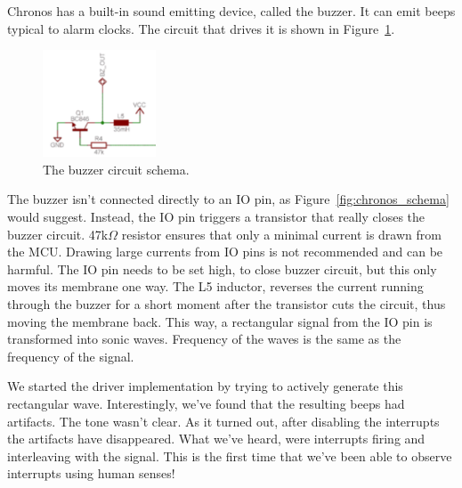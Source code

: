 Chronos has a built-in sound emitting device, called the buzzer. It can emit beeps typical to alarm clocks. The circuit that drives it is shown in Figure~\ref{fig:buzzer_circuit}.
\begin{figure}[h]
  \centering
  \includegraphics[width=0.30\textwidth]{img/buzzer_circuit.png}
  \caption{The buzzer circuit schema.}
  \label{fig:buzzer_circuit}
\end{figure}
The buzzer isn't connected directly to an IO pin, as Figure~\ref{fig:chronos_schema} would suggest. Instead, the IO pin triggers a transistor that really closes the buzzer circuit. 47k$\Omega$ resistor ensures that only a minimal current is drawn from the MCU. Drawing large currents from IO pins is not recommended and can be harmful. The IO pin needs to be set high, to close buzzer circuit, but this only moves its membrane one way. The L5 inductor, reverses the current running through the buzzer for a short moment after the transistor cuts the circuit, thus moving the membrane back. This way, a rectangular signal from the IO pin is transformed into sonic waves. Frequency of the waves is the same as the frequency of the signal.

We started the driver implementation by trying to actively generate this rectangular wave. Interestingly, we've found that the resulting beeps had artifacts. The tone wasn't clear. As it turned out, after disabling the interrupts the artifacts have disappeared. What we've heard, were interrupts firing and interleaving with the signal. This is the first time that we've been able to observe interrupts using human senses!

